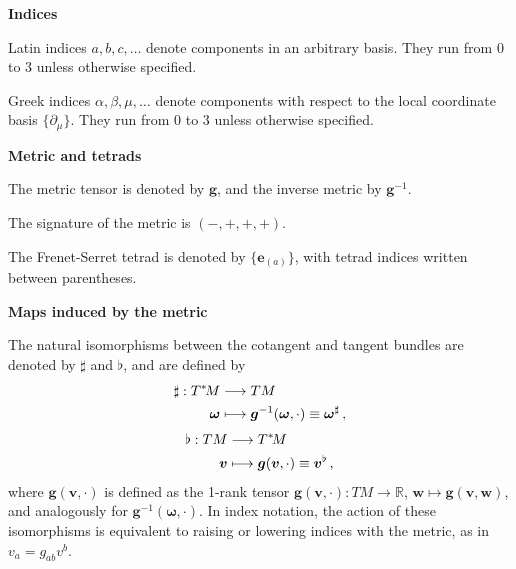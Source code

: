\documentclass[12pt]{article}
\newcommand{\mbi}[1]{\boldsymbol{#1}}    %
\renewcommand{\Re}{\mathbb{R}}           %
\begin{document}
\begin{center}  \bf Indices \end{center}
Latin indices $a,b,c,\dots$ denote components in an arbitrary basis. They run from $0$ to $3$ unless otherwise specified.

\noindent Greek indices $\alpha,\beta,\mu,\dots$ denote components with respect to the local coordinate basis $\{\partial_\mu\}$. They run from $0$ to $3$ unless otherwise specified.

\begin{center} \bf Metric and tetrads \end{center}
The metric tensor is denoted by $\mbi{g}$, and the inverse metric by $\mbi{g}^{-1}$.

\noindent The signature of the metric is $(-,+,+,+)$.

\noindent The Frenet-Serret tetrad is denoted by $\{\mbi{e}_{(a)}\}$, with tetrad indices written between parentheses. 

\begin{center} \bf Maps induced by the metric \end{center}
\noindent The natural isomorphisms between the cotangent and tangent bundles are denoted by $\sharp$ and $\flat$, and are defined by
\begin{align}
	\sharp:T^{*}\!M &\longrightarrow TM \notag \\
	\mbi{\omega} &\longmapsto \mbi{g}^{-1}(\mbi{\omega},\cdot)\equiv\mbi{\omega}^\sharp\,,
\end{align}
\begin{align}
	\flat: TM &\longrightarrow T^{*}\!M \notag \\
	\mbi{v} &\longmapsto \mbi{g}(\mbi{v},\cdot)\equiv \mbi{v}^\flat\,,
\end{align}
where $\mbi{g}(\mbi{v},\cdot)$ is defined as the 1-rank tensor $\mbi{g}(\mbi{v},\cdot):TM\to\Re$, $\mbi{w}\mapsto \mbi{g}(\mbi{v},\mbi{w})$, and analogously for $\mbi{g}^{-1}(\mbi{\omega},\cdot)$. In index notation, the action of these isomorphisms is equivalent to raising or lowering indices with the metric, as in $v_a = g_{ab}v^b$.
\end{document}
